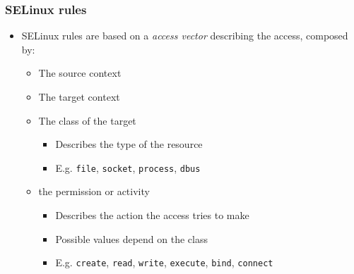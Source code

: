 \begin{frame}
	\frametitle{SELinux rules}
	\begin{itemize}
		\item SELinux rules are based on a \emph{access vector} describing the
			access, composed by:
			\begin{itemize}
				\item The source context
				\item The target context
				\item The class of the target
					\begin{itemize}
						\item Describes the type of the resource
						\item E.g. \texttt{file}, \texttt{socket}, \texttt{process},
							\texttt{dbus}
					\end{itemize}
				\item the permission or activity
					\begin{itemize}
						\item Describes the action the access tries to make
						\item Possible values depend on the class
						\item E.g. \texttt{create}, \texttt{read}, \texttt{write},
							\texttt{execute}, \texttt{bind}, \texttt{connect}
					\end{itemize}
			\end{itemize}
	\end{itemize}
\end{frame}

